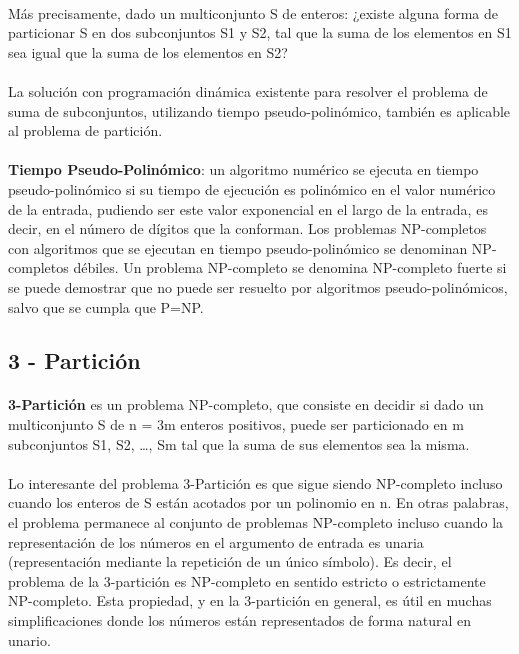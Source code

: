 \documentclass[11pt, a4paper,spanish]{article}
\begin{document}
				\paragraph{}
				Más precisamente, dado un multiconjunto S de enteros: ¿existe alguna forma de particionar S en dos subconjuntos S1 y S2, tal que la suma de los elementos en S1 sea igual que la suma de los elementos en S2?
				
				\paragraph{}
				La solución con programación dinámica existente para resolver el problema de suma de subconjuntos, utilizando tiempo pseudo-polinómico, también es aplicable al problema de partición.
			
				\paragraph{}
				{\bf Tiempo Pseudo-Polinómico}:  un algoritmo numérico se ejecuta en tiempo pseudo-polinómico si su tiempo de ejecución es polinómico en el valor numérico de la entrada, pudiendo ser este valor exponencial en el largo de la entrada, es decir, en el número de dígitos que la conforman.  Los problemas NP-completos con algoritmos que se ejecutan en tiempo pseudo-polinómico se denominan NP-completos débiles. Un problema NP-completo se denomina NP-completo fuerte si se puede demostrar que no puede ser resuelto por algoritmos pseudo-polinómicos, salvo que se cumpla que P=NP.
			
			\subsection{3 - Partición}

				\paragraph{}
				{\bf 3-Partición} es un problema NP-completo, que consiste en decidir si dado un multiconjunto S de n = 3m enteros positivos, puede ser particionado en m subconjuntos S1, S2, …, Sm tal que la suma de sus elementos sea la misma.
			
				\paragraph{}
				Lo interesante del problema 3-Partición es que sigue siendo NP-completo incluso cuando los enteros de S están acotados por un polinomio en n. En otras palabras, el problema permanece al conjunto de problemas NP-completo incluso cuando la representación de los números en el argumento de entrada es unaria (representación mediante la repetición de un único símbolo). Es decir, el problema de la 3-partición es NP-completo en sentido estricto o estrictamente NP-completo. Esta propiedad, y en la 3-partición en general, es útil en muchas simplificaciones donde los números están representados de forma natural en unario.
	
\end{document}
